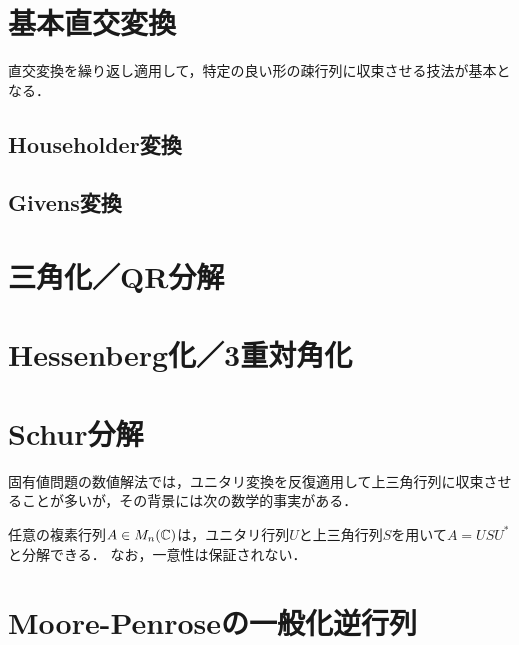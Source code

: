 \documentclass[uplatex, dvipdfmx]{jsreport}
\begin{document}
\section{基本直交変換}

\begin{tcolorbox}[colframe=ForestGreen, colback=ForestGreen!10!white,breakable,colbacktitle=ForestGreen!40!white,coltitle=black,fonttitle=\bfseries\sffamily,
title=]
    直交変換を繰り返し適用して，特定の良い形の疎行列に収束させる技法が基本となる．
\end{tcolorbox}

\subsection{Householder変換}

\subsection{Givens変換}

\section{三角化／QR分解}

\section{Hessenberg化／3重対角化}

\section{Schur分解}

\begin{tcolorbox}[colframe=ForestGreen, colback=ForestGreen!10!white,breakable,colbacktitle=ForestGreen!40!white,coltitle=black,fonttitle=\bfseries\sffamily,
title=]
    固有値問題の数値解法では，ユニタリ変換を反復適用して上三角行列に収束させることが多いが，その背景には次の数学的事実がある．
\end{tcolorbox}

\begin{theorem}
    任意の複素行列$A\in M_n(\mathbb{C})$は，ユニタリ行列$U$と上三角行列$S$を用いて$A=USU^*$と分解できる．
    なお，一意性は保証されない．
\end{theorem}

\section{Moore-Penroseの一般化逆行列}
\end{document}
